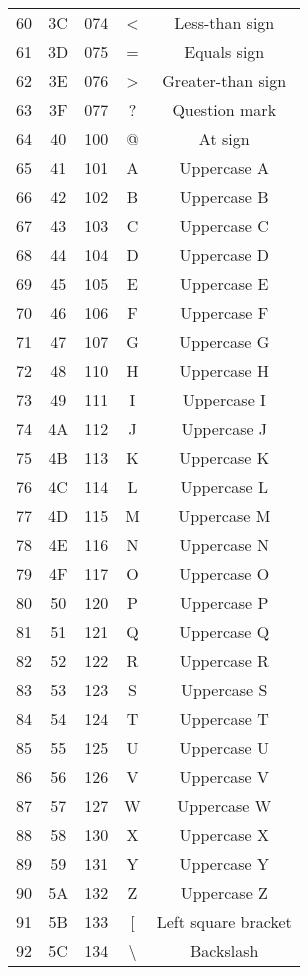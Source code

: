 \documentclass[12pt]{article} %
\begin{document}
\begin{longtable}{|c|c|c|c|c|}
    60 & 3C & 074 & < & Less-than sign \\
    61 & 3D & 075 & = & Equals sign \\
    62 & 3E & 076 & > & Greater-than sign \\
    63 & 3F & 077 & ? & Question mark \\
    64 & 40 & 100 & @ & At sign \\
    65 & 41 & 101 & A & Uppercase A \\
    66 & 42 & 102 & B & Uppercase B \\
    67 & 43 & 103 & C & Uppercase C \\
    68 & 44 & 104 & D & Uppercase D \\
    69 & 45 & 105 & E & Uppercase E \\
    70 & 46 & 106 & F & Uppercase F \\
    71 & 47 & 107 & G & Uppercase G \\
    72 & 48 & 110 & H & Uppercase H \\
    73 & 49 & 111 & I & Uppercase I \\
    74 & 4A & 112 & J & Uppercase J \\
    75 & 4B & 113 & K & Uppercase K \\
    76 & 4C & 114 & L & Uppercase L \\
    77 & 4D & 115 & M & Uppercase M \\
    78 & 4E & 116 & N & Uppercase N \\
    79 & 4F & 117 & O & Uppercase O \\
    80 & 50 & 120 & P & Uppercase P \\
    81 & 51 & 121 & Q & Uppercase Q \\
    82 & 52 & 122 & R & Uppercase R \\
    83 & 53 & 123 & S & Uppercase S \\
    84 & 54 & 124 & T & Uppercase T \\
    85 & 55 & 125 & U & Uppercase U \\
    86 & 56 & 126 & V & Uppercase V \\
    87 & 57 & 127 & W & Uppercase W \\
    88 & 58 & 130 & X & Uppercase X \\
    89 & 59 & 131 & Y & Uppercase Y \\
    90 & 5A & 132 & Z & Uppercase Z \\
    91 & 5B & 133 & [ & Left square bracket \\
    92 & 5C & 134 & \textbackslash & Backslash \\

\end{longtable}
\end{document}
